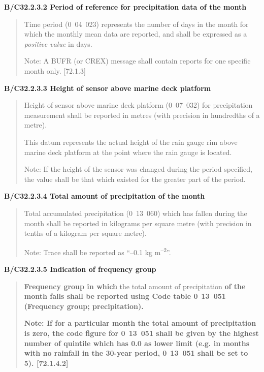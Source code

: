 \textbf{B/C32.2.3.2 Period of reference for precipitation data of the month}

\begin{quote}
Time period (0~04~023) represents the number of days in the month for which the monthly mean data are reported, and shall be expressed as a \emph{positive value} in days.

Note: A BUFR (or CREX) message shall contain reports for one specific month only. {[}72.1.3{]}
\end{quote}

\textbf{B/C32.2.3.3 Height of sensor above marine deck platform}

\begin{quote}
Height of sensor above marine deck platform (0~07~032) for precipitation measurement shall be reported in metres (with precision in hundredths of a metre).

This datum represents the actual height of the rain gauge rim above marine deck platform at the point where the rain gauge is located.

Note: If the height of the sensor was changed during the period specified, the value shall be that which existed for the greater part of the period.
\end{quote}

\textbf{B/C32.2.3.4 Total amount of precipitation of the month}

\begin{quote}
Total accumulated precipitation (0~13~060) which has fallen during the month shall be reported in kilograms per square metre (with precision in tenths of a kilogram per square metre).

Note: Trace shall be reported as ``--0.1 kg m\textsuperscript{--2}''.
\end{quote}

\textbf{B/C32.2.3.5 Indication of frequency group}

\begin{quote}
\textbf{Frequency group in which} the total amount of precipitation \textbf{of the month falls shall be reported using Code table 0}~\textbf{13~051 (Frequency group; precipitation).}

\textbf{Note: If for a particular month the total amount of precipitation is zero, the code figure for 0}~\textbf{13~051 shall be given by the highest number of quintile which has 0.0 as lower limit (e.g. in months with no rainfall in the 30-year period, 0}~\textbf{13~051 shall be set to 5). {[}72.1.4.2{]}}
\end{quote}


